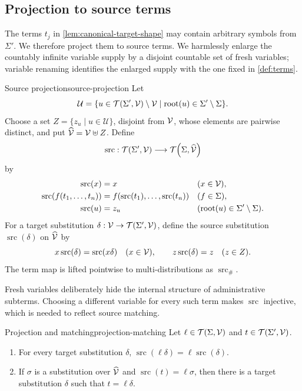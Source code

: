 \subsection{Projection to source terms}
\label{sec:source-projection}

The terms \(t_j\) in \cref{lem:canonical-target-shape} may contain arbitrary
symbols from \(\Sigma'\).  We therefore project them to source terms.  We
harmlessly enlarge the countably infinite variable supply by a disjoint
countable set of fresh variables; variable renaming identifies the enlarged
supply with the one fixed in \cref{def:terms}.

\begin{Definition}{Source projection}{source-projection}
  Let
  \[
    \mathcal U
      =\{u\in\mathcal{T}\!\left(\Sigma',\mathcal{V}\right)\setminus\mathcal{V}
          \mid\operatorname{root}(u)\in\Sigma'\setminus\Sigma\}.
  \]
  Choose a set \(Z=\{z_u\mid u\in\mathcal U\}\), disjoint from \(\mathcal{V}\),
  whose elements are pairwise distinct, and put
  \(\widehat{\mathcal{V}}=\mathcal{V}\uplus Z\).  Define
  \[
    \operatorname{src}:\mathcal{T}\!\left(\Sigma',\mathcal{V}\right)
      \longrightarrow \mathcal{T}\!\left(\Sigma,\widehat{\mathcal{V}}\right)
  \]
  by
  \[
    \begin{aligned}
      \operatorname{src}(x)&=x &&(x\in\mathcal{V}),\\
      \operatorname{src}(f(t_1,\ldots,t_n))
        &=f(\operatorname{src}(t_1),\ldots,
             \operatorname{src}(t_n)) &&(f\in\Sigma),\\
      \operatorname{src}(u)&=z_u
        &&(\operatorname{root}(u)\in\Sigma'\setminus\Sigma).
    \end{aligned}
  \]
  For a target substitution
  \(\delta:\mathcal{V}\to\mathcal{T}\!\left(\Sigma',\mathcal{V}\right)\), define the source substitution
  \(\operatorname{src}(\delta)\) on \(\widehat{\mathcal{V}}\) by
  \[
    x\operatorname{src}(\delta)=\operatorname{src}(x\delta)
      \quad(x\in\mathcal{V}),
    \qquad
    z\operatorname{src}(\delta)=z
      \quad(z\in Z).
  \]
  The term map is lifted pointwise to multi-distributions as
  \(\operatorname{src}_{\#}\).
\end{Definition}

Fresh variables deliberately hide the internal structure of administrative
subterms.  Choosing a different variable for every such term makes
\(\operatorname{src}\) injective, which is needed to reflect source matching.

\begin{Lemma}{Projection and matching}{projection-matching}
  Let \(\ell\in\mathcal{T}\!\left(\Sigma,\mathcal{V}\right)\) and
  \(t\in\mathcal{T}\!\left(\Sigma',\mathcal{V}\right)\).
  \begin{enumerate}
    \item For every target substitution \(\delta\),
          \(\operatorname{src}(\ell\delta)
            =\ell\operatorname{src}(\delta)\).
    \item If \(\sigma\) is a substitution over \(\widehat{\mathcal{V}}\) and
          \(\operatorname{src}(t)=\ell\sigma\), then there is a target
          substitution \(\delta\) such that \(t=\ell\delta\).
  \end{enumerate}
\end{Lemma}

